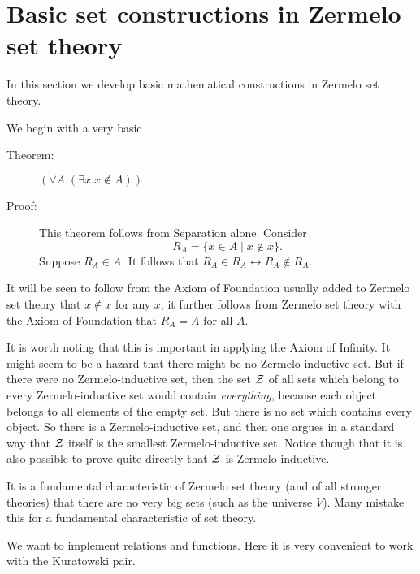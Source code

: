 \documentclass[12pt]{book}
\begin{document}
\newpage


\newpage

\section{Basic set constructions in Zermelo set theory}

In this section we develop basic mathematical constructions in Zermelo
set theory.

We begin with a very basic

\begin{description}

\item[Theorem:]  $(\forall A.(\exists x.x \not\in A))$

\item[Proof:] This theorem follows from Separation alone.  Consider
$$R_A = \{x \in A \mid x \not\in x\}.$$  Suppose $R_A \in A$.  It
follows that $R_A \in R_A \leftrightarrow R_A \not\in R_A$.

\end{description}

It will be seen to follow from the Axiom of Foundation usually added to Zermelo set theory that $x \not\in x$ for any $x$, it
further follows from Zermelo set theory with the Axiom of Foundation that
$R_A = A$ for all $A$.

It is worth noting that this is important in applying the Axiom of Infinity.  It might seem to be a hazard that there might be no Zermelo-inductive set.
But if there were no Zermelo-inductive set, then the set $\cal Z$ of all sets which belong to every Zermelo-inductive set would contain {\em everything\/}, because each object belongs to all elements of the empty set.  But there is no set which contains every object.  So there is a Zermelo-inductive set, and then one argues in a standard way that
$\cal Z$ itself is the smallest Zermelo-inductive set.  Notice though that it is also possible to prove quite directly that $\cal Z$ is Zermelo-inductive.

It is a fundamental characteristic of Zermelo set theory (and of all
stronger theories) that there are no very big sets (such as the
universe $V$).  Many mistake this for a fundamental characteristic of
set theory.

We want to implement relations and functions.  Here it is very
convenient to work with the Kuratowski pair.
\end{document}
